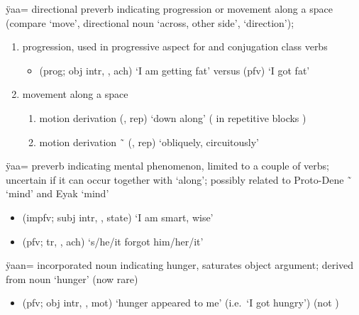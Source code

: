 \begin{morphdesc}[resume*=alphalist]
\item[ÿaa=]\label{m:ÿaa=along}
	directional preverb indicating progression or movement along a space
	(compare  ‘move’,
		directional noun  ‘across, other side’,
		 ‘direction’);
	\begin{enumerate}
	\item	progression, used in progressive aspect for  and  conjugation class verbs
		\begin{itemize}
		\item	{} (prog; obj intr, , ach) ‘I am getting fat’\newline
			versus  (pfv) ‘I got fat’
		\end{itemize}
	\item	movement along a space
		\begin{enumerate}
		\item	motion derivation
				 (,  rep) ‘down along’
				( in repetitive blocks )
		\item	motion derivation
				 \~\  (,  rep) ‘obliquely, circuitously’
		\end{enumerate}
	\end{enumerate}

\item[ÿaa=]\label{m:ÿaa=mind}
	preverb indicating mental phenomenon, limited to a couple of verbs;
	uncertain if it can occur together with  ‘along’;
	possibly related to Proto-Dene  \~\  ‘mind’ and Eyak  ‘mind’
	\begin{itemize}
	\item	{} (impfv; subj intr, ,  state) ‘I am smart, wise’
	\item	{} (pfv; tr, , ach) ‘s/he/it forgot him/her/it’
	\end{itemize}

\item[ÿaan=]
	incorporated noun indicating hunger,
	saturates object argument;
	derived from noun  ‘hunger’ (now rare)
	\begin{itemize}
	\item	{} (pfv; obj intr, , mot) ‘hunger appeared to me’ (i.e.\ ‘I got hungry’)\newline
		(not )
	\end{itemize}


\end{morphdesc}
